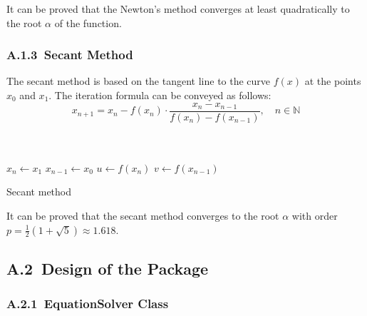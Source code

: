 \documentclass[a4paper]{article}
\begin{document}
It can be proved that the Newton's method converges at least quadratically to the root $\alpha$ of the function.

\subsubsection*{A.1.3\ Secant Method}

The secant method is based on the tangent line to the curve $f(x)$ at the points $x_0$ and $x_1$. The iteration formula can be conveyed as follows:
\begin{equation}
  x_{n + 1} = x_n - f(x_n) \cdot \frac{x_n - x_{n - 1}}{f(x_n) - f(x_{n - 1})}, \quad n \in \mathbb{N}
  \label{eq:Secant_method}
\end{equation}

\begin{algorithm}[H]
  \\
  \\
  \BlankLine
  \LinesNumbered
  $x_n \leftarrow x_1$\;
  $x_{n-1} \leftarrow x_0$\;
  $u \leftarrow f(x_n)$\;
  $v \leftarrow f(x_{n-1})$\;
  \caption{Secant method}
  \label{al:Secant_method}
\end{algorithm}

It can be proved that the secant method converges to the root $\alpha$ with order $p = \frac{1}{2}(1 + \sqrt{5}) \approx 1.618$.

\subsection*{A.2\ Design of the Package}

\subsubsection*{A.2.1\ EquationSolver Class}
\end{document}
